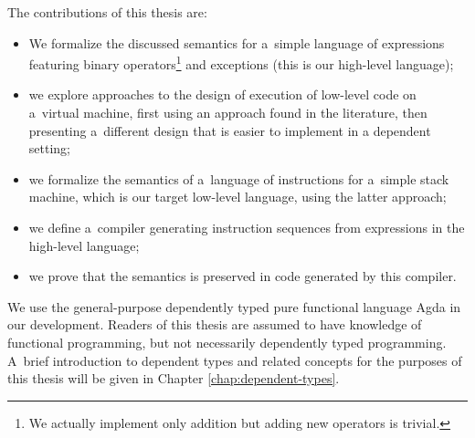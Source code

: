 \noindent The contributions of this thesis are:
\begin{itemize}
	\item We formalize the discussed semantics for a~simple language of expressions
		featuring binary operators\footnote{We actually implement only addition but adding new
		operators is trivial.} and exceptions (this is our high-level language);
	\item we explore approaches to the design of execution of low-level code on a~virtual
		machine, first using an approach found in the literature, then
		presenting a~different design that is easier to implement in a dependent setting;
	\item we formalize the semantics of a~language of instructions for a~simple stack machine,
		which is our target low-level language, using the latter approach;
	\item we define a~compiler generating instruction sequences from expressions in the high-level
		language;
	\item we prove that the semantics is preserved in code generated by this compiler.
\end{itemize}

\noindent We use the general-purpose dependently typed pure functional language Agda in
our development.
Readers of this thesis are assumed to have knowledge of functional programming, but
not necessarily dependently typed programming. A~brief introduction to dependent types and
related concepts for the purposes of this thesis will be given in Chapter \ref{chap:dependent-types}.

